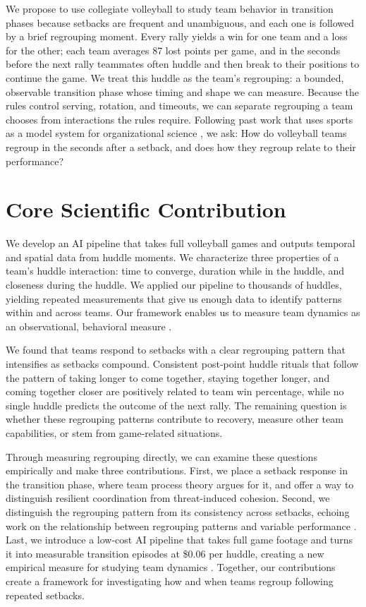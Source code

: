 \documentclass[12pt]{article}          %
\begin{document}
We propose to use collegiate volleyball to study team behavior in transition phases because setbacks are frequent and unambiguous, and each one is followed by a brief regrouping moment. Every rally yields a win for one team and a loss for the other; each team averages 87 lost points per game, and in the seconds before the next rally teammates often huddle and then break to their positions to continue the game. We treat this huddle as the team’s regrouping: a bounded, observable transition phase whose timing and shape we can measure. Because the rules control serving, rotation, and timeouts, we can separate regrouping a team chooses from interactions the rules require. Following past work that uses sports as a model system for organizational science \citep{dai2018quitting, day2012sporting, fonti2023sports, humphrey2014microdynamics}, we ask: How do volleyball teams regroup in the seconds after a setback, and does how they regroup relate to their performance?

\section{Core Scientific Contribution}
We develop an AI pipeline that takes full volleyball games and outputs temporal and spatial data from huddle moments. We characterize three properties of a team’s huddle interaction: time to converge, duration while in the huddle, and closeness during the huddle. We applied our pipeline to thousands of huddles, yielding repeated measurements that give us enough data to identify patterns within and across teams. Our framework enables us to measure team dynamics as an observational, behavioral measure \citep{kozlowskichao2018}. 

We found that teams respond to setbacks with a clear regrouping pattern that intensifies as setbacks compound. Consistent post-point huddle rituals that follow the pattern of taking longer to come together, staying together longer, and coming together closer are positively related to team win percentage, while no single huddle predicts the outcome of the next rally. The remaining question is whether these regrouping patterns contribute to recovery, measure other team capabilities, or stem from game-related situations.

Through measuring regrouping directly, we can examine these questions empirically and make three contributions. First, we place a setback response in the transition phase, where team process theory argues for it, and offer a way to distinguish resilient coordination from threat-induced cohesion. Second, we distinguish the regrouping pattern from its consistency across setbacks, echoing work on the relationship between regrouping patterns and variable performance \citep{feldman2003}. Last, we introduce a low-cost AI pipeline that takes full game footage and turns it into measurable transition episodes at \$0.06 per huddle, creating a new empirical measure for studying team dynamics \citep{kozlowskichao2018}. Together, our contributions create a framework for investigating how and when teams regroup following repeated setbacks. 
\end{document}
